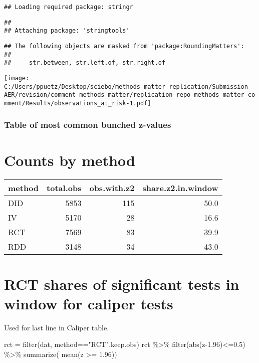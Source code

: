 \documentclass[
]{article}
\newenvironment{Shaded}{\begin{snugshade}}{\end{snugshade}}
\newcommand{\FloatTok}[1]{\textcolor[rgb]{0.00,0.00,0.81}{#1}}
\newcommand{\FunctionTok}[1]{\textcolor[rgb]{0.00,0.00,0.00}{#1}}
\newcommand{\NormalTok}[1]{#1}
\newcommand{\OtherTok}[1]{\textcolor[rgb]{0.56,0.35,0.01}{#1}}
\newcommand{\SpecialCharTok}[1]{\textcolor[rgb]{0.00,0.00,0.00}{#1}}
\newcommand{\StringTok}[1]{\textcolor[rgb]{0.31,0.60,0.02}{#1}}
\begin{document}
\begin{verbatim}
## Loading required package: stringr
\end{verbatim}

\begin{verbatim}
## 
## Attaching package: 'stringtools'
\end{verbatim}

\begin{verbatim}
## The following objects are masked from 'package:RoundingMatters':
## 
##     str.between, str.left.of, str.right.of
\end{verbatim}

\texttt{[image: C:/Users/ppuetz/Desktop/sciebo/methods\_matter\_replication/Submission AER/revision/comment\_methods\_matter/replication\_repo\_methods\_matter\_comment/Results/observations\_at\_risk-1.pdf]}

\hypertarget{table-of-most-common-bunched-z-values}{%
\subsubsection{Table of most common bunched
z-values}\label{table-of-most-common-bunched-z-values}}

\hypertarget{counts-by-method}{%
\section{Counts by method}\label{counts-by-method}}

\begin{longtable}[]{@{}lrrr@{}}
\toprule
method & total.obs & obs.with.z2 & share.z2.in.window \\
\midrule
\endhead
DID & 5853 & 115 & 50.0 \\
IV & 5170 & 28 & 16.6 \\
RCT & 7569 & 83 & 39.9 \\
RDD & 3148 & 34 & 43.0 \\
\bottomrule
\end{longtable}

\hypertarget{rct-shares-of-significant-tests-in-window-for-caliper-tests}{%
\section{RCT shares of significant tests in window for caliper
tests}\label{rct-shares-of-significant-tests-in-window-for-caliper-tests}}

Used for last line in Caliper table.

\begin{Shaded}
\begin{Highlighting}[]
\NormalTok{rct }\OtherTok{=} \FunctionTok{filter}\NormalTok{(dat, method}\SpecialCharTok{==}\StringTok{"RCT"}\NormalTok{,keep.obs)}
\NormalTok{rct }\SpecialCharTok{\%\textgreater{}\%} \FunctionTok{filter}\NormalTok{(}\FunctionTok{abs}\NormalTok{(z}\FloatTok{{-}1.96}\NormalTok{)}\SpecialCharTok{\textless{}=}\FloatTok{0.5}\NormalTok{) }\SpecialCharTok{\%\textgreater{}\%} \FunctionTok{summarize}\NormalTok{( }\FunctionTok{mean}\NormalTok{(z }\SpecialCharTok{\textgreater{}=} \FloatTok{1.96}\NormalTok{))}
\end{Highlighting}
\end{Shaded}
\end{document}

